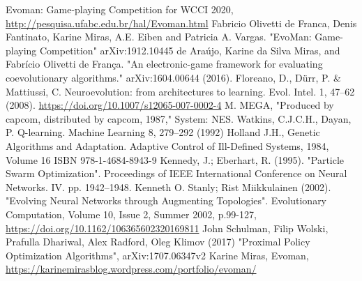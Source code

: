 \documentclass[conference]{IEEEtran}
\begin{document}
    \begin{thebibliography}{00}
         Evoman: Game-playing Competition for WCCI 2020, \url{http://pesquisa.ufabc.edu.br/hal/Evoman.html}
         Fabricio Olivetti de Franca, Denis Fantinato, Karine Miras, A.E. Eiben and Patricia A. Vargas.
        "EvoMan: Game-playing Competition" arXiv:1912.10445
         de Araújo, Karine da Silva Miras, and Fabrício Olivetti de França.
        "An electronic-game framework for evaluating coevolutionary algorithms." arXiv:1604.00644 (2016).
         Floreano, D., Dürr, P. \& Mattiussi, C. Neuroevolution: from architectures to learning. Evol. Intel. 1, 47–62 (2008). \url{https://doi.org/10.1007/s12065-007-0002-4}
         M. MEGA, "Produced by capcom, distributed by capcom, 1987," System: NES.
         Watkins, C.J.C.H., Dayan, P. Q-learning. Machine Learning 8, 279–292 (1992)
         Holland J.H., Genetic Algorithms and Adaptation. Adaptive Control of Ill-Defined Systems, 1984, Volume 16 ISBN 978-1-4684-8943-9
         Kennedy, J.; Eberhart, R. (1995). "Particle Swarm Optimization". Proceedings of IEEE International Conference on Neural Networks. IV. pp. 1942–1948.
         Kenneth O. Stanly; Rist Miikkulainen (2002). "Evolving Neural Networks through Augmenting Topologies". Evolutionary Computation, Volume 10, Issue 2, Summer 2002, p.99-127, \url{https://doi.org/10.1162/106365602320169811}
         John Schulman, Filip Wolski, Prafulla Dhariwal, Alex Radford, Oleg Klimov (2017) "Proximal Policy Optimization Algorithms", arXiv:1707.06347v2
         Karine Miras, Evoman, \url{https://karinemirasblog.wordpress.com/portfolio/evoman/}
    \end{thebibliography}
\end{document}
